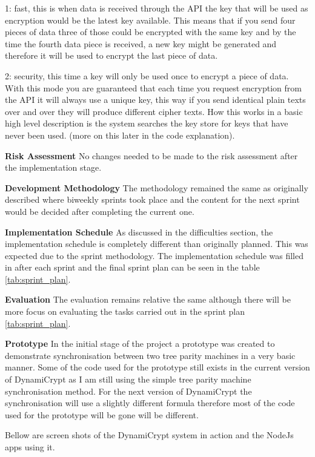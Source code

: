 1: fast, this is when data is received through the API the key that will be used as encryption would be the latest key available. This means that if you send four pieces of data three of those could be encrypted with the same key and by the time the fourth data piece is received, a new key might be generated and therefore it will be used to encrypt the last piece of data.

2: security, this time a key will only be used once to encrypt a piece of data. With this mode you are guaranteed that each time you request encryption from the API it will always use a unique key, this way if you send identical plain texts over and over they will produce different cipher texts. How this works in a basic high level description is the system searches the key store for keys that have never been used. (more on this later in the code explanation).

\textbf{Risk Assessment}
No changes needed to be made to the risk assessment after the implementation stage.

\textbf{Development Methodology}
The methodology remained the same as originally described where biweekly sprints took place and the content for the next sprint would be decided after completing the current one. 

\textbf{Implementation Schedule}
As discussed in the difficulties section, the implementation schedule is completely different than originally planned. This was expected due to the sprint methodology. The implementation schedule was filled in after each sprint and the final sprint plan can be seen in the table \ref{tab:sprint_plan}. 

\textbf{Evaluation}
The evaluation remains relative the same although there will be more focus on evaluating the tasks carried out in the sprint plan \ref{tab:sprint_plan}. 

\textbf{Prototype}
In the initial stage of the project a prototype was created to demonstrate synchronisation between two tree parity machines in a very basic manner. Some of the code used for the prototype still exists in the current version of DynamiCrypt as I am still using the simple tree parity machine synchronisation method. For the next version of DynamiCrypt the synchronisation will use a slightly different formula therefore most of the code used for the prototype will be gone will be different. 

Bellow are screen shots of the DynamiCrypt system in action and the NodeJs apps using it.

